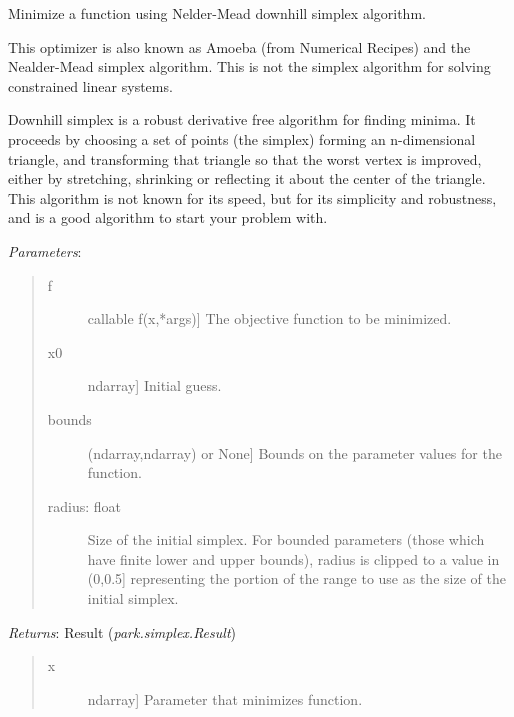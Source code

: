 \documentclass[letterpaper,10pt,english]{sphinxmanual}
\begin{document}
\begin{fulllineitems}
\label{api/simplex:refl1d.simplex.simplex}
Minimize a function using Nelder-Mead downhill simplex algorithm.

This optimizer is also known as Amoeba (from Numerical Recipes) and
the Nealder-Mead simplex algorithm.  This is not the simplex algorithm
for solving constrained linear systems.

Downhill simplex is a robust derivative free algorithm for finding
minima.  It proceeds by choosing a set of points (the simplex) forming
an n-dimensional triangle, and transforming that triangle so that the
worst vertex is improved, either by stretching, shrinking or reflecting
it about the center of the triangle.  This algorithm is not known for
its speed, but for its simplicity and robustness, and is a good algorithm
to start your problem with.

\emph{Parameters}:
\begin{quote}
\begin{description}
\item[{f}] \leavevmode{[}callable f(x,*args){]}
The objective function to be minimized.

\item[{x0}] \leavevmode{[}ndarray{]}
Initial guess.

\item[{bounds}] \leavevmode{[}(ndarray,ndarray) or None{]}
Bounds on the parameter values for the function.

\item[{radius: float}] \leavevmode
Size of the initial simplex.  For bounded parameters (those
which have finite lower and upper bounds), radius is clipped
to a value in (0,0.5{]} representing the portion of the
range to use as the size of the initial simplex.

\end{description}
\end{quote}

\emph{Returns}: Result (\emph{park.simplex.Result})
\begin{quote}
\begin{description}
\item[{x}] \leavevmode{[}ndarray{]}
Parameter that minimizes function.


\end{description}
\end{quote}
\end{fulllineitems}
\end{document}
